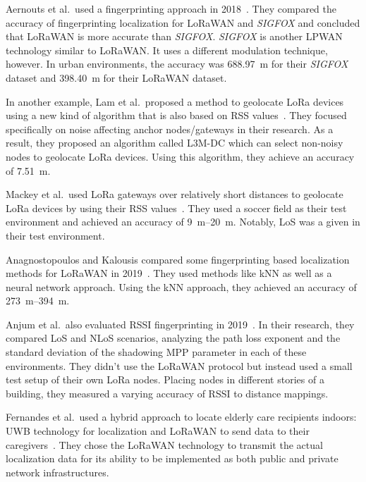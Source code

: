 Aernouts et al.\ used a fingerprinting approach in 2018~\cite{aernouts_sigfox_2018}.
They compared the accuracy of fingerprinting localization for \ac{LoRaWAN} and \emph{SIGFOX} and concluded that \ac{LoRaWAN} is more accurate than \emph{SIGFOX}.
\emph{SIGFOX} is another \ac{LPWAN} technology similar to \ac{LoRaWAN}.
It uses a different modulation technique, however.
In urban environments, the accuracy was \SI{688.97}{\meter} for their \emph{SIGFOX} dataset and \SI{398.40}{\meter} for their LoRaWAN dataset.

In another example, Lam et al.~proposed a method to geolocate \ac{LoRa} devices using a new kind of algorithm that is also based on \ac{RSS} values~\cite{lam_new_2018}.
They focused specifically on noise affecting anchor nodes/gateways in their research.
As a result, they proposed an algorithm called \acf{L3M-DC} which can select non-noisy nodes to geolocate \ac{LoRa} devices.
Using this algorithm, they achieve an accuracy of \SI{7.51}{\meter}.

Mackey et al.~used \ac{LoRa} gateways over relatively short distances to geolocate \ac{LoRa} devices by using their \ac{RSS} values~\cite{mackey_lora-based_2019}.
They used a soccer field as their test environment and achieved an accuracy of \SIrange{9}{20}{\meter}.
Notably, \ac{LoS} was a given in their test environment.

Anagnostopoulos and Kalousis compared some fingerprinting based localization methods for \ac{LoRaWAN} in 2019~\cite{anagnostopoulos_reproducible_2019}.
They used methods like \ac{kNN} as well as a neural network approach.
Using the \ac{kNN} approach, they achieved an accuracy of \SIrange{273}{394}{\meter}.

Anjum et al.\ also evaluated \ac{RSSI} fingerprinting in 2019~\cite{anjum_analysis_2019}.
In their research, they compared \ac{LoS} and \ac{NLoS} scenarios, analyzing the path loss exponent and the standard deviation of the shadowing \ac{MPP} parameter in each of these environments.
They didn't use the \ac{LoRaWAN} protocol but instead used a small test setup of their own \ac{LoRa} nodes.
Placing nodes in different stories of a building, they measured a varying accuracy of \ac{RSSI} to distance mappings.

Fernandes et al.\ used a hybrid approach to locate elderly care recipients indoors: \ac{UWB} technology for localization and \ac{LoRaWAN} to send data to their caregivers~\cite{fernandes_hybrid_2020}.
They chose the \ac{LoRaWAN} technology to transmit the actual localization data for its ability to be implemented as both public and private network infrastructures.

